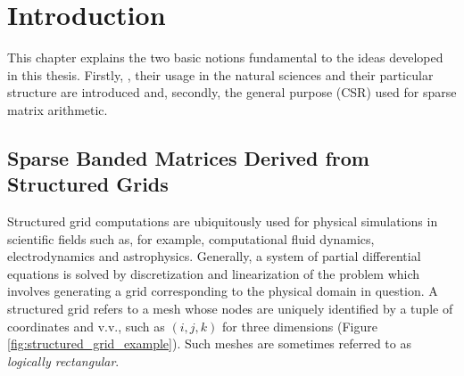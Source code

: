 \chapter{Introduction}

  This chapter explains the two basic notions fundamental to the ideas developed in this thesis. Firstly,
  , their usage in the natural sciences and their
  particular structure are introduced and, secondly, the general purpose  (CSR) used for sparse matrix arithmetic.

  \section{Sparse Banded Matrices Derived from Structured Grids} \label{sec:structured-grid-matrices}

    Structured grid computations are ubiquitously used for physical simulations in scientific fields such as, for
    example, computational fluid dynamics, electrodynamics and astrophysics. Generally, a system of partial differential
    equations is solved by discretization and linearization of the problem which involves generating a grid
    corresponding to the physical domain in question. A structured grid refers to a mesh whose nodes are uniquely
    identified by a tuple of coordinates and v.v., such as $(i, j, k)$ for three dimensions (Figure
    \ref{fig:structured_grid_example}). Such meshes are sometimes referred to as \emph{logically rectangular}.

